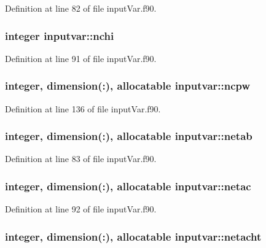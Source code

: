 Definition at line 82 of file input\-Var.\-f90.

\hypertarget{classinputvar_ac34eff504af528e971c7174dfcb39028}{
\subsubsection[{nchi}]{\setlength{\rightskip}{0pt plus 5cm}integer inputvar\-::nchi}}\label{classinputvar_ac34eff504af528e971c7174dfcb39028}


Definition at line 91 of file input\-Var.\-f90.

\hypertarget{classinputvar_a58640e3824c5fa77d6d108cf97b7a0bc}{
\subsubsection[{ncpw}]{\setlength{\rightskip}{0pt plus 5cm}integer, dimension(\-:), allocatable inputvar\-::ncpw}}\label{classinputvar_a58640e3824c5fa77d6d108cf97b7a0bc}


Definition at line 136 of file input\-Var.\-f90.

\hypertarget{classinputvar_af109996c7b379bac5d6c3d89c5b6df1d}{
\subsubsection[{netab}]{\setlength{\rightskip}{0pt plus 5cm}integer, dimension(\-:), allocatable inputvar\-::netab}}\label{classinputvar_af109996c7b379bac5d6c3d89c5b6df1d}


Definition at line 83 of file input\-Var.\-f90.

\hypertarget{classinputvar_ad9998f4f97f100bf6294fb8fa083bfe7}{
\subsubsection[{netac}]{\setlength{\rightskip}{0pt plus 5cm}integer, dimension(\-:), allocatable inputvar\-::netac}}\label{classinputvar_ad9998f4f97f100bf6294fb8fa083bfe7}


Definition at line 92 of file input\-Var.\-f90.

\hypertarget{classinputvar_a7f82eda09f512dfe2f28f82efc5187ad}{
\subsubsection[{netacht}]{\setlength{\rightskip}{0pt plus 5cm}integer, dimension(\-:), allocatable inputvar\-::netacht}}\label{classinputvar_a7f82eda09f512dfe2f28f82efc5187ad}


